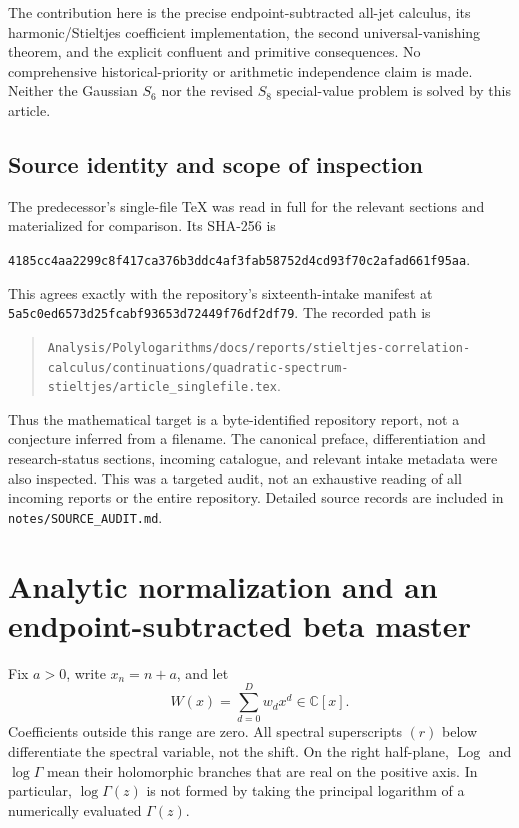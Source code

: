 \documentclass[11pt]{article}
\numberwithin{equation}{section}
\theoremstyle{definition}\newtheorem{definition}[theorem]{Definition}
\theoremstyle{remark}\newtheorem{remark}[theorem]{Remark}
\DeclareMathOperator{\Log}{Log}
\newcommand{\C}{\mathbb C}
\newcommand{\src}[1]{\nolinkurl{#1}}
\newcommand{\pin}{\src{5a5c0ed6573d25fcabf93653d72449f76df2df79}}
\begin{document}
The contribution here is the precise endpoint-subtracted all-jet
calculus, its harmonic/Stieltjes coefficient implementation, the second
universal-vanishing theorem, and the explicit confluent and primitive
consequences. No comprehensive historical-priority or arithmetic
independence claim is made. Neither the Gaussian $S_6$ nor the revised
$S_8$ special-value problem is solved by this article.

\subsection{Source identity and scope of inspection}
The predecessor's single-file TeX was read in full for the relevant
sections and materialized for comparison. Its SHA-256 is
\begin{center}\small
\src{4185cc4aa2299c8f417ca376b3ddc4af3fab58752d4cd93f70c2afad661f95aa}.
\end{center}
This agrees exactly with the repository's sixteenth-intake manifest at
\pin. The recorded path is
\begin{quote}\small
\src{Analysis/Polylogarithms/docs/reports/stieltjes-correlation-calculus/continuations/quadratic-spectrum-stieltjes/article_singlefile.tex}.
\end{quote}
Thus the mathematical target is a byte-identified repository report,
not a conjecture inferred from a filename. The canonical preface,
differentiation and research-status sections, incoming catalogue, and
relevant intake metadata were also inspected. This was a targeted audit,
not an exhaustive reading of all incoming reports or the entire repository.
Detailed source records are included in \src{notes/SOURCE_AUDIT.md}.

\section{Analytic normalization and an endpoint-subtracted beta master}
\label{hsd:sec:beta}
Fix $a>0$, write $x_n=n+a$, and let
\begin{equation}\label{hsd:eq:W}
 W(x)=\sum_{d=0}^D w_dx^d\in\C[x].
\end{equation}
Coefficients outside this range are zero. All spectral superscripts
$(r)$ below differentiate the spectral variable, not the shift.
On the right half-plane, $\Log$ and $\log\Gamma$ mean their holomorphic
branches that are real on the positive axis. In particular,
$\log\Gamma(z)$ is not formed by taking the principal logarithm of a
numerically evaluated $\Gamma(z)$.
\end{document}
